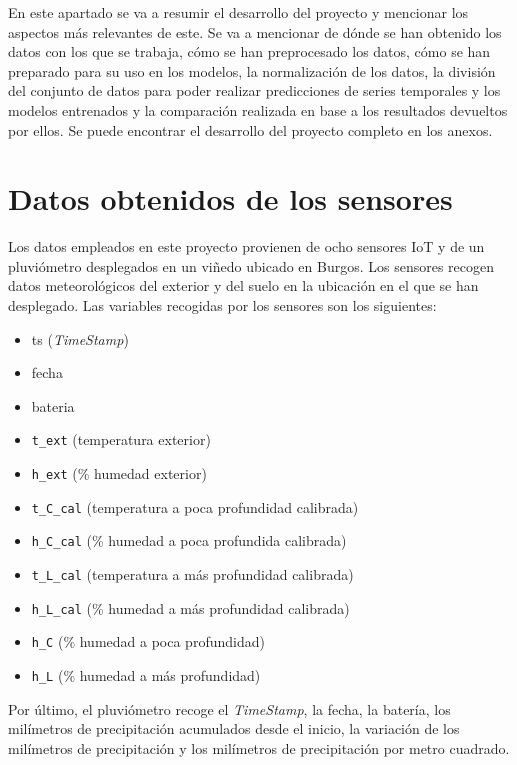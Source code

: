 \setcounter{secnumdepth}{4}


En este apartado se va a resumir el desarrollo del proyecto y mencionar los aspectos más relevantes de este. Se va a mencionar de dónde se han obtenido los datos con los que se trabaja, cómo se han preprocesado los datos, cómo se han preparado para su uso en los modelos, la normalización de los datos, la división del conjunto de datos para poder realizar predicciones de series temporales y los modelos entrenados y la comparación realizada en base a los resultados devueltos por ellos. Se puede encontrar el desarrollo del proyecto completo en los anexos.

\section{Datos obtenidos de los sensores}

Los datos empleados en este proyecto provienen de ocho sensores IoT y de un pluviómetro desplegados en un viñedo ubicado en Burgos. Los sensores recogen datos meteorológicos del exterior y del suelo en la ubicación en el que se han desplegado. Las variables recogidas por los sensores son los siguientes:

\begin{itemize}
    \item ts (\textit{TimeStamp})
    \item fecha
    \item bateria
    \item \texttt{t\_ext} (temperatura exterior)
    \item \texttt{h\_ext} (\% humedad exterior)
    \item \texttt{t\_C\_cal} (temperatura a poca profundidad calibrada)
    \item \texttt{h\_C\_cal} (\% humedad a poca profundida calibrada)
    \item \texttt{t\_L\_cal} (temperatura a más profundidad calibrada)
    \item \texttt{h\_L\_cal} (\% humedad a más profundidad calibrada)
    \item \texttt{h\_C} (\% humedad a poca profundidad)
    \item \texttt{h\_L} (\% humedad a más profundidad)
\end{itemize}

Por último, el pluviómetro recoge el \textit{TimeStamp}, la fecha, la batería, los milímetros de precipitación acumulados desde el inicio, la variación de los milímetros de precipitación y los milímetros de precipitación por metro cuadrado.

